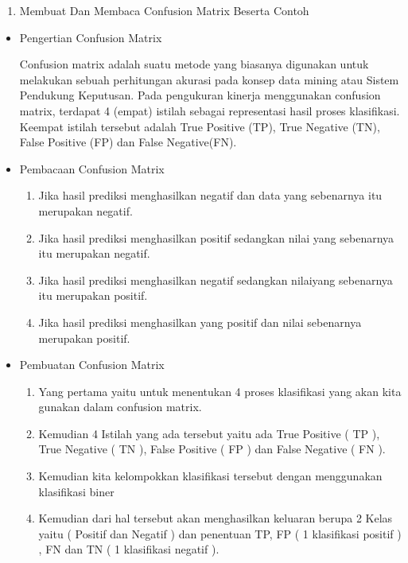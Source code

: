 \begin{enumerate}
\item Membuat Dan Membaca Confusion Matrix Beserta Contoh
\end{enumerate}
\begin{itemize}
\item Pengertian Confusion Matrix
\par Confusion matrix adalah suatu metode yang biasanya digunakan untuk melakukan sebuah perhitungan akurasi pada konsep data mining atau Sistem Pendukung Keputusan. Pada pengukuran kinerja menggunakan confusion matrix, terdapat 4 (empat) istilah sebagai representasi hasil proses klasifikasi. Keempat istilah tersebut adalah True Positive (TP), True Negative (TN), False Positive (FP) dan False Negative(FN).
\par
\item Pembacaan Confusion Matrix
\begin{enumerate}
\item Jika hasil prediksi menghasilkan negatif dan data yang sebenarnya itu merupakan negatif.
\item Jika hasil prediksi menghasilkan positif sedangkan nilai yang sebenarnya itu merupakan negatif.
\item Jika hasil prediksi menghasilkan negatif sedangkan nilaiyang sebenarnya itu merupakan positif.
\item Jika hasil prediksi menghasilkan yang positif dan nilai sebenarnya merupakan positif.
\end{enumerate}
\par
\par
\item Pembuatan Confusion Matrix
\begin{enumerate}
\item Yang pertama yaitu untuk menentukan 4 proses klasifikasi yang akan kita gunakan dalam confusion matrix.
\item Kemudian 4 Istilah yang ada tersebut yaitu ada True Positive ( TP ), True Negative ( TN ), False Positive ( FP ) dan False Negative ( FN ).
\item Kemudian kita kelompokkan klasifikasi tersebut dengan menggunakan klasifikasi biner
\item Kemudian dari hal tersebut akan menghasilkan keluaran berupa 2 Kelas yaitu ( Positif dan Negatif ) dan penentuan TP, FP ( 1 klasifikasi positif ) , FN dan TN ( 1 klasifikasi negatif ).
\end{enumerate}
\par
\end{itemize}

